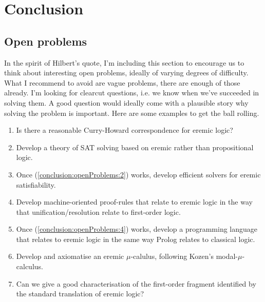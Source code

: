 \section{Conclusion}\label{conclusion}



\subsection{Open problems} In the spirit of Hilbert's quote, I'm including this
section to encourage us to think about interesting open problems,
ideally of varying degrees of difficulty. What I recommend to avoid
are vague problems, there are enough of those already. I'm looking for
clearcut questions, i.e. we know when we've succeeded in solving them.
A good question would ideally come with a plausible story why solving
the problem is important.  Here are some examples to get the ball
rolling.

\begin{enumerate}

\item Is there a reasonable Curry-Howard correspondence for eremic
  logic?

\item\label{conclusion:openProblems:2}  Develop a theory of SAT solving based on eremic rather than
  propositional logic.

\item Once (\ref{conclusion:openProblems:2}) works, develop efficient
  solvers for eremic satisfiability.

\item\label{conclusion:openProblems:4} Develop machine-oriented proof-rules that relate to eremic logic
  in the way that unification/resolution relate to first-order logic.

\item Once (\ref{conclusion:openProblems:4}) works, develop a
  programming language that relates to eremic logic in the same way
  Prolog relates to classical logic.

\item Develop and axiomatise an eremic $\mu$-calulus, following
  Kozen's modal-$\mu$-calculus.

\item Can we give a good characterisation of the first-order fragment
  identified by the standard translation of eremic logic?

\end{enumerate}

